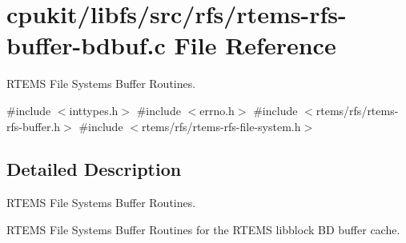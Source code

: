 \hypertarget{rtems-rfs-buffer-bdbuf_8c}{}\section{cpukit/libfs/src/rfs/rtems-\/rfs-\/buffer-\/bdbuf.c File Reference}
\label{rtems-rfs-buffer-bdbuf_8c}


R\+T\+E\+MS File Systems Buffer Routines.  


{\ttfamily \#include $<$inttypes.\+h$>$}\newline
{\ttfamily \#include $<$errno.\+h$>$}\newline
{\ttfamily \#include $<$rtems/rfs/rtems-\/rfs-\/buffer.\+h$>$}\newline
{\ttfamily \#include $<$rtems/rfs/rtems-\/rfs-\/file-\/system.\+h$>$}\newline


\subsection{Detailed Description}
R\+T\+E\+MS File Systems Buffer Routines. 

R\+T\+E\+MS File Systems Buffer Routines for the R\+T\+E\+MS libblock BD buffer cache. 